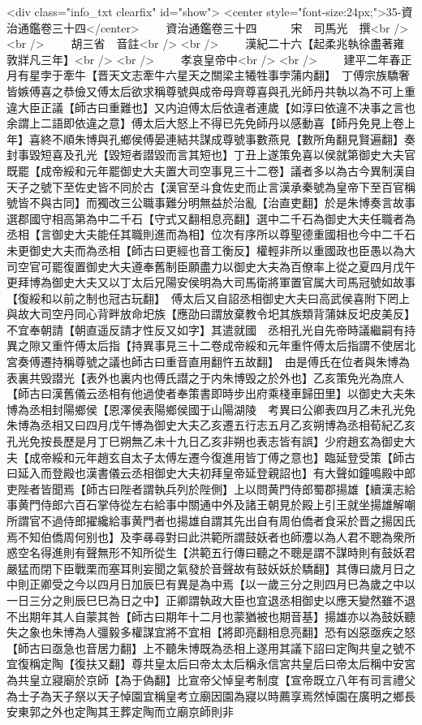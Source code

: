 <div class="info_txt clearfix" id="show">
<center style="font-size:24px;">35-資治通鑑卷三十四</center>
  　　資治通鑑卷三十四　　　宋　司馬光　撰<br />
<br />
　　胡三省　音註<br />
<br />
　　漢紀二十六【起柔兆執徐盡著雍敦牂凡三年】<br />
<br />
　　孝哀皇帝中<br />
<br />
　　建平二年春正月有星孛于牽牛【晋天文志牽牛六星天之關梁主犧牲事孛蒲内翻】　丁傅宗族驕奢皆嫉傅喜之恭儉又傅太后欲求稱尊號與成帝母齊尊喜與孔光師丹共執以為不可上重違大臣正議【師古曰重難也】又内迫傅太后依違者連歲【如淳曰依違不决事之言也余謂上二語即依違之意】傅太后大怒上不得已先免師丹以感動喜【師丹免見上卷上年】喜終不順朱博與孔鄉侯傅晏連結共謀成尊號事數燕見【數所角翻見賢遍翻】奏封事毀短喜及孔光【毀短者譛毀而言其短也】丁丑上遂策免喜以侯就第御史大夫官既罷【成帝綏和元年罷御史大夫置大司空事見三十二卷】議者多以為古今異制漢自天子之號下至佐史皆不同於古【漢官至斗食佐史而止言漢承秦號為皇帝下至百官稱號皆不與古同】而獨改三公職事難分明無益於治亂【治直吏翻】於是朱博奏言故事選郡國守相高第為中二千石【守式又翻相息亮翻】選中二千石為御史大夫任職者為丞相【言御史大夫能任其職則進而為相】位次有序所以尊聖德重國相也今中二千石未更御史大夫而為丞相【師古曰更經也音工衡反】權輕非所以重國政也臣愚以為大司空官可罷復置御史大夫遵奉舊制臣願盡力以御史大夫為百僚率上從之夏四月戊午更拜博為御史大夫又以丁太后兄陽安侯明為大司馬衛將軍置官属大司馬冠號如故事【復綏和以前之制也冠古玩翻】　傅太后又自詔丞相御史大夫曰高武侯喜附下罔上與故大司空丹同心背畔放命圯族【應劭曰謂放棄教令圯其族類背蒲妹反圯皮美反】不宜奉朝請【朝直遥反請才性反又如字】其遣就國　丞相孔光自先帝時議繼嗣有持異之隙又重忤傅太后指【持異事見三十二卷成帝綏和元年重忤傅太后指謂不使居北宮奏傅遷持稱尊號之議也師古曰重音直用翻忤五故翻】　由是傅氏在位者與朱博為表裏共毁譛光【表外也裏内也傅氏譛之于内朱博毁之於外也】乙亥策免光為庶人【師古曰漢舊儀云丞相有他過使者奉策書即時步出府乘棧車歸田里】以御史大夫朱博為丞相封陽鄉侯【恩澤侯表陽鄉侯國于山陽湖陵　考異曰公卿表四月乙未孔光免朱博為丞相又曰四月戊午博為御史大夫乙亥遷五行志五月乙亥朔博為丞相荀紀乙亥孔光免按長歷是月丁巳朔無乙未十九日乙亥非朔也表志皆有誤】少府趙玄為御史大夫【成帝綏和元年趙玄自太子太傅左遷今復進用皆丁傅之意也】臨延登受策【師古曰延入而登殿也漢書儀云丞相御史大夫初拜皇帝延登親詔也】有大聲如鐘鳴殿中郎吏陛者皆聞焉【師古曰陛者謂執兵列於陛側】上以問黄門侍郎蜀郡揚雄【續漢志給事黄門侍郎六百石掌侍從左右給事中關通中外及諸王朝見於殿上引王就坐揚雄解嘲所謂官不過侍郎擢纔給事黄門者也揚雄自謂其先出自有周伯僑者食采於晋之揚因氏焉不知伯僑周何别也】及李㝷尋對曰此洪範所謂鼓妖者也師灋以為人君不聰為衆所惑空名得進則有聲無形不知所從生【洪範五行傳曰聽之不聰是謂不謀時則有鼓妖君嚴猛而閉下臣戰栗而塞耳則妄聞之氣發於音聲故有鼓妖妖於驕翻】其傳曰歲月日之中則正卿受之今以四月日加辰巳有異是為中焉【以一歲三分之則四月巳為歲之中以一日三分之則辰巳巳為日之中】正卿謂執政大臣也宜退丞相御史以應天變然雖不退不出期年其人自蒙其咎【師古曰期年十二月也蒙猶被也期音基】揚雄亦以為鼓妖聽失之象也朱博為人彊毅多權謀宜將不宜相【將即亮翻相息亮翻】恐有凶惡亟疾之怒【師古曰亟急也音居力翻】上不聽朱博既為丞相上遂用其議下詔曰定陶共皇之號不宜復稱定陶【復扶又翻】尊共皇太后曰帝太太后稱永信宮共皇后曰帝太后稱中安宮為共皇立寢廟於京師【為于偽翻】比宣帝父悼皇考制度【宣帝既立八年有司言禮父為士子為天子祭以天子悼園宜稱皇考立廟因園為寢以時薦享焉然悼園在廣明之鄉長安東郭之外也定陶其王葬定陶而立廟京師則非